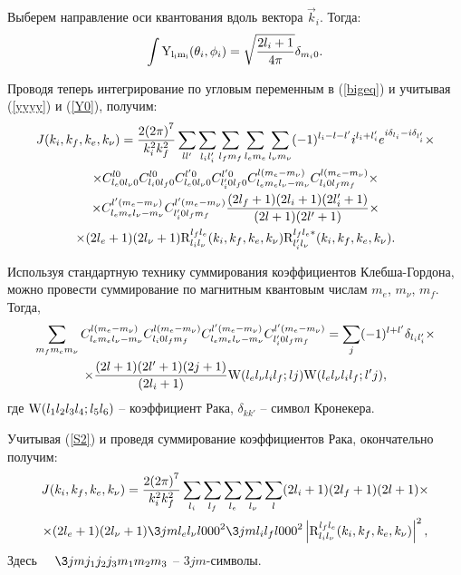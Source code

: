 Выберем направление оси квантования вдоль вектора $\vec k_i$. Тогда:
\begin{eqnarray}\label{Y0}
\int{{\rm Y_{l_i m_i}}(\theta_i, \phi_i)}= \sqrt{{{2l_i+1}\over{4\pi}}} \delta_{m_i 0}.
\end{eqnarray}


Проводя теперь интегрирование по угловым переменным в (\ref{bigeq})
и учитывая (\ref{yyyy}) и (\ref{Y0}), получим:
\begin{multline}\label{mat2}
J(k_i,k_f,k_e,k_\nu)={{2{(2\pi)}^7}\over{k_i^2 k_f^2}}
\sum_{ll'} \sum_{l_i l'_i} \sum_{l_f m_f} \sum_{l_e m_e} \sum_{l_\nu m_\nu}
(-1)^{l_i-l-l'} i^{l_i+l'_i} e^{i\delta_{l_i}-i\delta_{l'_i}}\times\\
\times C^{l 0}_{l_e 0 l_\nu  0}
C^{l 0}_{l_i 0 l_f  0} C^{l' 0}_{l_e 0 l_\nu  0} C^{l' 0}_{l'_i 0 l_f  0}
C^{l (m_e - m_\nu)}_{l_e m_e l_\nu -m_\nu}  C^{l (m_e - m_\nu)}_{l_i 0 l_f  m_f}\times\\
\times
C^{l' (m_e - m_\nu)}_{l_e m_e l_\nu -m_\nu}  C^{l' (m_e - m_\nu)}_{l'_i 0 l_f m_f}
{{(2l_f+1)(2l_i+1)(2l'_i+1)}\over{(2l+1)(2l'+1)}}\times\\
\times (2l_e+1)(2l_\nu+1) {\rm R}^{l_f l_e}_{l_i l_\nu}(k_i, k_f, k_e, k_\nu){\rm R}^{l_f l_e *}_{l'_i l_\nu}(k_i, k_f, k_e, k_\nu).
\end{multline}

Используя стандартную технику суммирования коэффициентов Клеб\-ша-Гор\-до\-на,
можно провести суммирование по магнитным квантовым числам
$m_e$, $m_\nu$, $m_f$. Тогда,
\begin{multline}\label{S2}
\sum_{m_f m_e m_\nu}
C^{l (m_e - m_\nu)}_{l_e m_e l_\nu -m_\nu}  C^{l (m_e - m_\nu)}_{l_i 0 l_f  m_f}
C^{l' (m_e - m_\nu)}_{l_e m_e l_\nu -m_\nu}  C^{l' (m_e - m_\nu)}_{l'_i 0 l_f m_f}
=\sum_j(-1)^{l+l'}\delta_{l_i l'_i}\times\\
\times{{(2l+1)(2l'+1)(2j+1)}\over{(2l_i+1)}}
{\rm W}(l_e l_\nu l_i l_f;l j) {\rm W}(l_e l_\nu l_i l_f;l' j),
\end{multline}
где ${\rm W}(l_1 l_2 l_3 l_4 ; l_5 l_6)$ -- коэффициент Рака,
$\delta_{k k'}$ -- символ Кронекера.

Учитывая (\ref{S2}) и проведя суммирование коэффициентов Рака, окончательно
получим:
\begin{multline}\label{2mat2}
J(k_i,k_f,k_e,k_\nu)
={{2{(2\pi)}^7}\over{k_i^2 k_f^2}}
\sum_{l_i} \sum_{l_f} \sum_{l_e} \sum_{l_\nu} \sum_{l}
(2l_i+1)(2l_f+1)(2l+1)
\times\\
\times(2l_e+1)(2l_\nu+1)
{\3jm{l_e}{l_\nu}{l}{0}{0}{0}}^2 {\3jm{l_i}{l_f}{l}{0}{0}{0}}^2
\left|{ \rm R}^{l_f l_e}_{l_i l_\nu}(k_i, k_f, k_e, k_\nu)\right|^2,
\end{multline}
Здесь $\quad \3jm{j_1}{j_2}{j_3}{m_1}{m_2}{m_3}$ -- $3jm$-символы.

